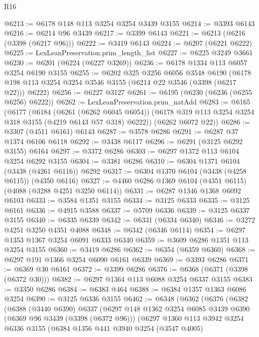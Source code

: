 \begin{lexlean}{R16}
\begin{coremodule}
@6213 := @6178 @148 @113 @3254 @3254 @3439 @3155
@6214 := @3393 @6143
@6216 := @6214 @96 @3439
@6217 := @3399 @6143
@6221 := @6213 (@6216 (@3398 (@6217 @96)))
@6222 := @3419 @6143
@6224 := @6207 (@6221 @6222)
@6225 := LexLeanPreservation.prim_length_list
@6227 := @6225 @3249 @3661
@6230 := @6201 (@6224 (@6227 @3269))
@6236 := @6178 @1334 @113 @6057 @3254 @6190 @3155
@6255 := @6202
    @325
    @3256
    @6056
    @3548
    @6190
    (@6178 @198 @113 @3254 @3254 @3546 @3155 (@6214 @22 @3546 (@3398 (@6217 @22))) @6222)
@6256 := @6227 @3127
@6261 := @6195 (@6230 (@6236 (@6255 @6256) @6222))
@6262 := LexLeanPreservation.prim_natAdd
@6283 := @6165
    (@6177
      (@6184
        (@6261 (@6262 @6045 @6054))
        (@6178 @319 @113 @3254 @3254 @318 @3155 (@4219 @6143 @57 @318) @6222))
      (@6262 @6072 @22))
@6286 := @3307 (@4511 @6161) @6143
@6287 := @3578 @6286
@6291 := @6287 @37 @1374 @6106 @6118
@6292 := @3438 @6117
@6296 := @6291 (@3125 @6292 @3155) @6164
@6297 := @3372 @6286
@6303 := @6297 @1372 @113 @6104 @3254 @6292 @3155
@6304 := @3381 @6286
@6310 := @6304 @1371 @6104 (@3438 (@4261 @6116)) @6292
@6317 := @6304 @1370 @6104 (@3438 (@4258 @6115)) (@4350 @6116)
@6327 := @4460 @6286 @1369 @6104 (@4351 @6115) (@4088 (@3288 @4251 @3250 @6114))
@6331 := @6287 @1346 @1368 @6092 @6103
@6333 := @3584 @1351 @3155
@6334 := @3125 @6333
@6335 := @3125 @6161
@6336 := @4915 @3588
@6337 := @5709 @6336
@6339 := @3125 @6337 @3155
@6340 := @6335 @6339
@6342 := @6331 (@6334 @6340)
@6346 := @3272 @4251 @3250 @4351 @4088
@6348 := @6342 (@6346 @6114)
@6354 := @6297 @1353 @1367 @3254 @6091 @6333 @6340
@6359 := @3609 @6286 @1351 @113 @3254 @3155
@6360 := @3419 @6286
@6362 := @6354 (@6359 @6360)
@6368 := @6297 @191 @1366 @3254 @6090 @6161 @6339
@6369 := @3393 @6286
@6371 := @6369 @30 @6161
@6372 := @3399 @6286
@6376 := @6368 (@6371 (@3398 (@6372 @30)))
@6382 := @6297 @1364 @113 @6088 @3254 @6337 @3155
@6383 := @3350 @6286
@6384 := @6383 @464
@6388 := @6384 @1357 @1363 @6086 @3254
@6390 := @3125 @6336 @3155
@6462 := @6348
    (@6362
      (@6376
        (@6382
          (@6388
            (@3440 @6390)
            @6337
            (@6297
              @148
              @1362
              @3254
              @6085
              @3439
              @6390
              (@6369 @96 @3439 (@3398 (@6372 @96)))
              (@6297
                @1360
                @113
                @3942
                @3254
                @6336
                @3155
                (@6384
                  @1356
                  @441
                  @3940
                  @3254
                  (@3547 @4005)

\end{coremodule}
\end{lexlean}
